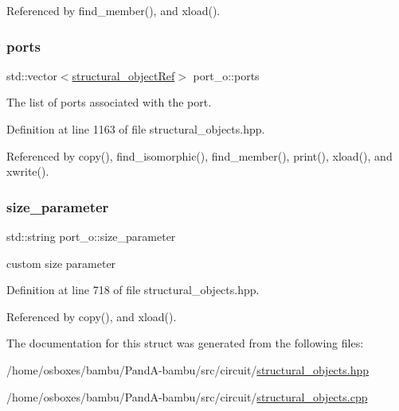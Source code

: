 Referenced by find\+\_\+member(), and xload().

\mbox{\label{structport__o_aaed01c24cd23370f2168c8b756630d8d}} 
\subsubsection{\texorpdfstring{ports}{ports}}
{\footnotesize\ttfamily std\+::vector$<$\hyperlink{structural__objects_8hpp_a8ea5f8cc50ab8f4c31e2751074ff60b2}{structural\+\_\+object\+Ref}$>$ port\+\_\+o\+::ports\hspace{0.3cm}{\ttfamily [private]}}



The list of ports associated with the port. 



Definition at line 1163 of file structural\+\_\+objects.\+hpp.



Referenced by copy(), find\+\_\+isomorphic(), find\+\_\+member(), print(), xload(), and xwrite().

\mbox{\label{structport__o_a11b04084ee7c72114e5d55fca832dd27}} 
\subsubsection{\texorpdfstring{size\+\_\+parameter}{size\_parameter}}
{\footnotesize\ttfamily std\+::string port\+\_\+o\+::size\+\_\+parameter}



custom size parameter 



Definition at line 718 of file structural\+\_\+objects.\+hpp.



Referenced by copy(), and xload().



The documentation for this struct was generated from the following files\+:\begin{DoxyCompactItemize}
\item 
/home/osboxes/bambu/\+Pand\+A-\/bambu/src/circuit/\hyperlink{structural__objects_8hpp}{structural\+\_\+objects.\+hpp}\item 
/home/osboxes/bambu/\+Pand\+A-\/bambu/src/circuit/\hyperlink{structural__objects_8cpp}{structural\+\_\+objects.\+cpp}\end{DoxyCompactItemize}

